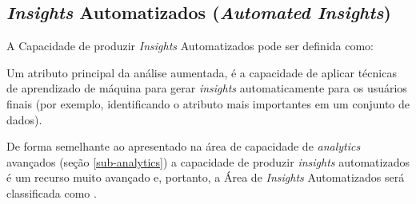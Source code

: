 \subsection{\emph{Insights} Automatizados (\emph{Automated Insights})}
\label{sub-insights}

A Capacidade de produzir \emph{Insights} Automatizados pode ser definida como:

\begin{definition}
Um atributo principal da análise aumentada, é a capacidade de aplicar técnicas de aprendizado de máquina para gerar \emph{insights} automaticamente para os usuários finais (por exemplo, identificando o atributo mais importantes em um conjunto de dados).
\end{definition}


De forma semelhante ao apresentado na área de capacidade de \emph{analytics} avançados (seção \ref{sub-analytics}) a capacidade de produzir \emph{insights} automatizados é um recurso muito avançado e, portanto, a Área de \emph{Insights} Automatizados será classificada como \WOULD.
